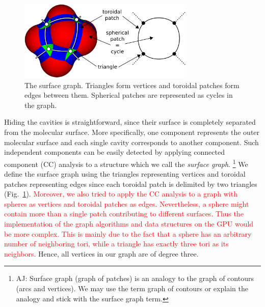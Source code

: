 
\begin{figure}[htb]
  \centering
  \includegraphics[width=3.3in]{image/graph.png}
  \caption{The surface graph.
	Triangles form vertices and toroidal patches form edges between them.
	Spherical patches are represented as cycles in the graph.}
	\label{fig:graph}
\end{figure}

Hiding the cavities is straightforward, since their surface is completely separated from the molecular surface.
More specifically, one component represents the outer molecular surface and each single cavity corresponds to another component.
Such independent components can be easily detected by applying connected component (CC) analysis to a structure which we call the \textit{surface graph}.
\footnote{AJ: Surface graph (graph of patches) is an analogy to the graph of contours (arcs and vertices). We may use the term graph of contours or explain the analogy and stick with the surface graph term.}
We define the surface graph using the triangles representing vertices and toroidal patches representing edges since each toroidal patch is delimited by two triangles (Fig.~\ref{fig:graph}).
\textcolor{red}{Moreover, we also tried to apply the CC analysis to a graph with spheres as vertices and toroidal patches as edges.
Nevertheless, a sphere might contain more than a single patch contributing to different surfaces.
Thus the implementation of the graph algorithms and data structures on the GPU would be more complex.
This is mainly due to the fact that a sphere has an arbitrary number of neighboring tori, while a triangle has exactly three tori as its neighbors.} 
Hence, all vertices in our graph are of degree three.

